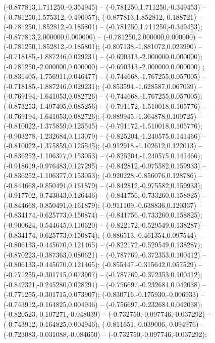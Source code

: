  (-0.877813,1.711250,-0.354945) -- (-0.781250,1.711250,-0.349453) -- (-0.781250,1.575312,-0.490957);
 (-0.877813,1.852812,-0.188721) -- (-0.781250,1.852812,-0.185801) -- (-0.781250,1.711250,-0.349453);
 (-0.877813,2.000000,0.000000) -- (-0.781250,2.000000,0.000000) -- (-0.781250,1.852812,-0.185801);
 (-0.807138,-1.881072,0.023990) -- (-0.718185,-1.887246,0.029231) -- (-0.690313,-2.000000,0.000000);
 (-0.781250,-2.000000,0.000000) -- (-0.690313,-2.000000,0.000000) ;
 (-0.831405,-1.756911,0.046477) -- (-0.744668,-1.767255,0.057005) -- (-0.718185,-1.887246,0.029231);
 (-0.853594,-1.628587,0.067039) -- (-0.769194,-1.641053,0.082726) -- (-0.744668,-1.767255,0.057005);
 (-0.873253,-1.497405,0.085256) -- (-0.791172,-1.510018,0.105776) -- (-0.769194,-1.641053,0.082726);
 (-0.889945,-1.364878,0.100725) -- (-0.810022,-1.375859,0.125545) -- (-0.791172,-1.510018,0.105776);
 (-0.903278,-1.232684,0.113079) -- (-0.825204,-1.240575,0.141466) -- (-0.810022,-1.375859,0.125545);
 (-0.912918,-1.102612,0.122013) -- (-0.836252,-1.106377,0.153053) -- (-0.825204,-1.240575,0.141466);
 (-0.918619,-0.976483,0.127295) -- (-0.842812,-0.975582,0.159933) -- (-0.836252,-1.106377,0.153053);
 (-0.920228,-0.856076,0.128786) -- (-0.844668,-0.850491,0.161879) -- (-0.842812,-0.975582,0.159933);
 (-0.917702,-0.743043,0.126446) -- (-0.841756,-0.733260,0.158825) -- (-0.844668,-0.850491,0.161879);
 (-0.911109,-0.638836,0.120337) -- (-0.834174,-0.625773,0.150874) -- (-0.841756,-0.733260,0.158825);
 (-0.900624,-0.544645,0.110620) -- (-0.822172,-0.529549,0.138287) -- (-0.834174,-0.625773,0.150874);
 (-0.886513,-0.461354,0.097544) -- (-0.806133,-0.445670,0.121465) -- (-0.822172,-0.529549,0.138287);
 (-0.870223,-0.387363,0.080621) -- (-0.787769,-0.372353,0.100412) -- (-0.806133,-0.445670,0.121465);
 (-0.855447,-0.315642,0.057529) -- (-0.771255,-0.301715,0.073907) -- (-0.787769,-0.372353,0.100412);
 (-0.842321,-0.245280,0.028291) -- (-0.756697,-0.232684,0.042038) -- (-0.771255,-0.301715,0.073907);
 (-0.830716,-0.175930,-0.006933) -- (-0.743912,-0.164825,0.004946) -- (-0.756697,-0.232684,0.042038);
 (-0.820523,-0.107271,-0.048039) -- (-0.732750,-0.097746,-0.037292) -- (-0.743912,-0.164825,0.004946);
 (-0.811651,-0.039006,-0.094976) -- (-0.723083,-0.031088,-0.084650) -- (-0.732750,-0.097746,-0.037292);

